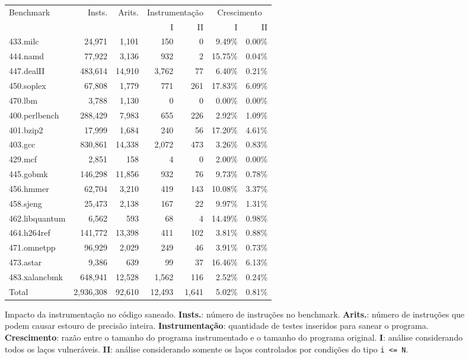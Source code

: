 \documentclass{llncs}
\begin{document}
\begin{figure}[t!]
\begin{center}
\renewcommand{\arraystretch}{1.2}
\begin{tabular*}{\textwidth}{@{\extracolsep{\fill}}lrrrrrr} \toprule
Benchmark		&		Insts.	&		Arits.	&	\multicolumn{2}{c}{Instrumentação}		&	\multicolumn{2}{c}{Crescimento}			\\ 
													\cmidrule{4-5} 			\cmidrule{6-7}
{}				&	{}			&	{}			&	I		&	II		&	I		&	II		\\ \midrule
433.milc			&	24,971		&	1,101		&	150		&	0		&	9.49\%	&	0.00\%	\\
444.namd			&	77,922		&	3,136		&	932		&	2		&	15.75\%	&	0.04\%	\\
447.dealII		&	483,614		&	14,910		&	3,762	&	77		&	6.40\%	&	0.21\%	\\
450.soplex		&	67,808		&	1,779		&	771		&	261		&	17.83\%	&	6.09\%	\\
470.lbm			&	3,788		&	1,130		&	0		&	0		&	0.00\%	&	0.00\%	\\
400.perlbench	&	288,429		&	7,983		&	655		&	226		&	2.92\%	&	1.09\%	\\
401.bzip2		&	17,999		&	1,684		&	240		&	56		&	17.20\%	&	4.61\%	\\
403.gcc			&	830,861		&	14,338		&	2,072	&	473		&	3.26\%	&	0.83\%	\\
429.mcf			&	2,851		&	158			&	4		&	0		&	2.00\%	&	0.00\%	\\
445.gobmk		&	146,298		&	11,856		&	932		&	76		&	9.73\%	&	0.78\%	\\
456.hmmer		&	62,704		&	3,210		&	419		&	143		&	10.08\%	&	3.37\%	\\
458.sjeng		&	25,473		&	2,138		&	167		&	22		&	9.97\%	&	1.31\%	\\
462.libquantum	&	6,562		&	593			&	68		&	4		&	14.49\%	&	0.98\%	\\
464.h264ref		&	141,772		&	13,398		&	411		&	102		&	3.81\%	&	0.88\%	\\
471.omnetpp		&	96,929		&	2,029		&	249		&	46		&	3.91\%	&	0.73\%	\\
473.astar		&	9,386		&	639			&	99		&	37		&	16.46\%	&	6.13\%	\\
483.xalancbmk	&	648,941		&	12,528		&	1,562	&	116		&	2.52\%	&	0.24\%	\\ \midrule
Total			&	2,936,308	&	92,610		&	12,493	&	1,641	&	5.02\%	&	0.81\%	\\ \bottomrule
\end{tabular*}
\end{center}
\caption{Impacto da instrumentação no código saneado.
{\bf Insts.}: número de instruções no benchmark.
{\bf Arits.}: número de instruções que podem causar estouro de precisão inteira.
{\bf Instrumentação}: quantidade de testes inseridos para sanear o programa.
{\bf Crescimento}: razão entre o tamanho do programa instrumentado e o tamanho do
programa original.
{\bf I}: análise considerando todos os laços vulneráveis.
{\bf II}: análise considerando somente os laços controlados por condições do
tipo \texttt{i <= N}.}
\label{fig:instImpact}
\end{figure}
\end{document}
